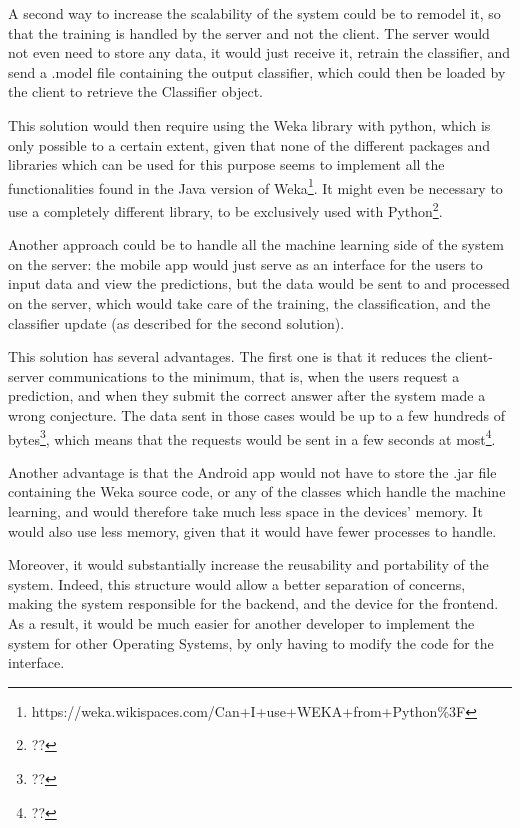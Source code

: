 \documentclass{mproj}
\begin{document}
A second way to increase the scalability of the system could be to remodel it, so that the training is handled by the server and not the client. The server would not even need to store any data, it would just receive it, retrain the classifier, and send a .model file containing the output classifier, which could then be loaded by the client to retrieve the Classifier object. \par

This solution would then require using the Weka library with python, which is only possible to a certain extent, given that none of the different packages and libraries which can be used for this purpose seems to implement all the functionalities found in the Java version of Weka\footnote{https://weka.wikispaces.com/Can+I+use+WEKA+from+Python\%3F}. It might even be necessary to use a completely different library, to be exclusively used with Python\footnote{??}. \par

Another approach could be to handle all the machine learning side of the system on the server: the mobile app would just serve as an interface for the users to input data and view the predictions, but the data would be sent to and processed on the server, which would take care of the training, the classification, and the classifier update (as described for the second solution). \par

This solution has several advantages. The first one is that it reduces the client-server communications to the minimum, that is, when the users request a prediction, and when they submit the correct answer after the system made a wrong conjecture. The data sent in those cases would be up to a few hundreds of bytes\footnote{??}, which means that the requests would be sent in a few seconds at most\footnote{??}. \par

Another advantage is that the Android app would not have to store the .jar file containing the Weka source code, or any of the classes which handle the machine learning, and would therefore take much less space in the devices' memory. It would also use less memory, given that it would have fewer processes to handle. \par

Moreover, it would substantially increase the reusability and portability of the system. Indeed, this structure would allow a better separation of concerns, making the system responsible for the backend, and the device for the frontend. As a result, it would be much easier for another developer to implement the system for other Operating Systems, by only having to modify the code for the interface. \par
\end{document}
